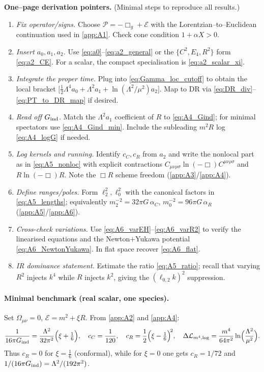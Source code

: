 \documentclass{iopjournal}
\begin{document}
\vspace{4pt}
\noindent\textbf{One–page derivation pointers.} (Minimal steps to reproduce all  results.)
\begin{enumerate}
  \item \emph{Fix operator/signs.} Choose $\mathcal{P}=-\Box_g+\mathcal{E}$ with the Lorentzian–to–Euclidean continuation used in \cref{app:A1}. Check cone condition $1+\alpha X>0$.
  \item \emph{Insert $a_0,a_1,a_2$.} Use \eqref{eq:a0}–\eqref{eq:a2_general} or the $\{C^2,E_4,R^2\}$ form \eqref{eq:a2_CE}. For a scalar, the compact specialisation is \eqref{eq:a2_scalar_xi}.
  \item \emph{Integrate the proper time.} Plug into \eqref{eq:Gamma_loc_cutoff} to obtain the local bracket $\big[\tfrac12\Lambda^4 a_0+\Lambda^2 a_1+\ln(\Lambda^2/\mu^2)a_2\big]$. Map to DR via \eqref{eq:DR_div}–\eqref{eq:PT_to_DR_map} if desired.
  \item \emph{Read off $G_{\rm ind}$.} Match the $\Lambda^2 a_1$ coefficient of $R$ to \eqref{eq:A4_Gind}; for minimal spectators use \eqref{eq:A4_Gind_min}. Include the subleading $m^2R$ log \eqref{eq:A4_logG} if needed.
  \item \emph{Log kernels and running.} Identify $c_C,c_R$ from $a_2$ and write the nonlocal part as in \eqref{eq:A5_nonloc} with explicit contractions $C_{\mu\nu\rho\sigma}\ln(-\Box)C^{\mu\nu\rho\sigma}$ and $R\ln(-\Box)R$. Note the $\Box R$ scheme freedom (\cref{app:A3}/\cref{app:A4}).
  \item \emph{Define ranges/poles.} Form $\ell_2^2,\ell_0^2$ with the canonical factors in \eqref{eq:A5_lengths}; equivalently $m_2^{-2}\!=\!32\pi G\,\alpha_C$, $m_0^{-2}\!=\!96\pi G\,\alpha_R$ (\cref{app:A5}/\cref{app:A6}).
  \item \emph{Cross-check variations.} Use \eqref{eq:A6_varEH}–\eqref{eq:A6_varR2} to verify the linearised equations and the Newton+Yukawa potential \eqref{eq:A6_NewtonYukawa}. In flat space recover \eqref{eq:A6_flat}.
  \item \emph{IR dominance statement.} Estimate the ratio \eqref{eq:A5_ratio}; recall that varying $R^2$ injects $k^4$ while $R$ injects $k^2$, giving the $(\ell_{0,2}k)^2$ suppression.
\end{enumerate}

\paragraph{Minimal benchmark (real scalar, one species).}
Set $\Omega_{\mu\nu}=0$, $\mathcal{E}=m^2+\xi R$.
From \cref{app:A2} and \cref{app:A4}:
\[
\frac{1}{16\pi G_{\rm ind}}=\frac{\Lambda^2}{32\pi^2}\Big(\xi+\tfrac16\Big),\quad
c_C=\frac{1}{120},\quad
c_R=\frac{1}{2}\Big(\xi-\tfrac16\Big)^{\!2},\quad
\Delta\mathcal L_{m^4,\log}=\frac{m^4}{64\pi^2}\ln\!\Big(\frac{\Lambda^2}{\mu^2}\Big).
\]
Thus $c_R=0$ for $\xi=\tfrac16$ (conformal), while for $\xi=0$ one gets $c_R=1/72$ and $1/(16\pi G_{\rm ind})=\Lambda^2/(192\pi^2)$.
\end{document}

